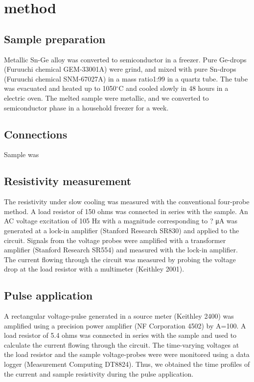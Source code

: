 \documentclass[aip,apl,reprint]{revtex4-1}
\begin{document}
\section{method}
\subsection{Sample preparation}
Metallic Sn-Ge alloy was converted to semiconductor in a freezer.
Pure Ge-drops (Furuuchi chemical GEM-33001A) were grind, and mixed with pure Sn-drops (Furuuchi chemical SNM-67027A) in a mass ratio1:99 in a quartz tube. The tube was evacuated and heated up to 1050$^\circ$C and cooled slowly in 48 hours in a electric oven. The melted sample were metallic, and we converted to semiconductor phase in a household freezer for a week. 

\subsection{Connections}
Sample was 

\subsection{Resistivity measurement}
The resistivity under slow cooling was measured with the conventional four-probe method. A load resistor of 150 ohms was connected in series with the sample. An AC voltage excitation of 105 Hz with a magnitude corresponding to ? μA was generated at a lock-in amplifier (Stanford Research SR830) and applied to the circuit. Signals from the voltage probes were amplified with a transformer amplifier (Stanford Research SR554) and measured with the lock-in amplifier. The current flowing through the circuit was measured by probing the voltage drop at the load resistor with a multimeter (Keithley 2001).

\subsection{Pulse application}
A rectangular voltage-pulse generated in a source meter (Keithley 2400) was amplified using a precision power amplifier (NF Corporation 4502) by A=100. A load resistor of 5.4 ohms was connected in series with the sample and used to calculate the current flowing through the circuit. The time-varying voltages at the load resistor and the sample voltage-probes were were monitored using a data logger (Measurement Computing DT8824). Thus, we obtained the time profiles of the current and sample resistivity during the pulse application. 
\end{document}
